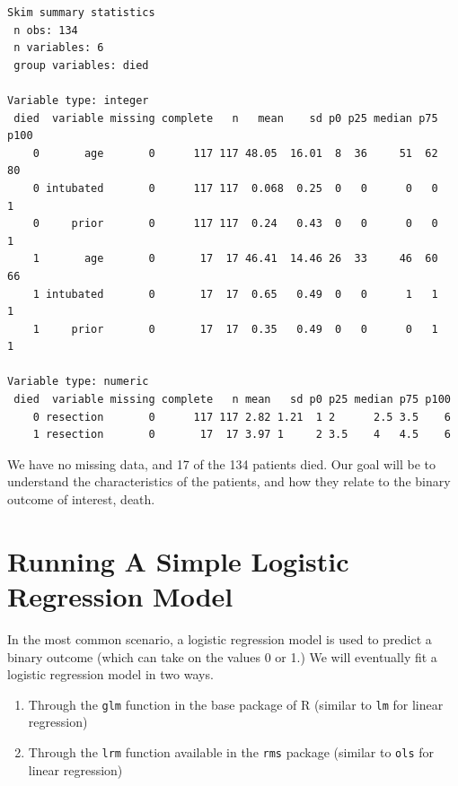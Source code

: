 \documentclass[]{book}
\newenvironment{Shaded}{\begin{snugshade}}{\end{snugshade}}
\newcommand{\KeywordTok}[1]{\textcolor[rgb]{0.13,0.29,0.53}{\textbf{#1}}}
\newcommand{\StringTok}[1]{\textcolor[rgb]{0.31,0.60,0.02}{#1}}
\newcommand{\OperatorTok}[1]{\textcolor[rgb]{0.81,0.36,0.00}{\textbf{#1}}}
\newcommand{\NormalTok}[1]{#1}
\providecommand{\tightlist}{%
  \setlength{\itemsep}{0pt}\setlength{\parskip}{0pt}}
\theoremstyle{definition}
\theoremstyle{definition}
\theoremstyle{definition}
\theoremstyle{remark}
\begin{document}
\begin{Shaded}
\end{Shaded}

\begin{verbatim}
Skim summary statistics
 n obs: 134 
 n variables: 6 
 group variables: died 

Variable type: integer 
 died  variable missing complete   n   mean    sd p0 p25 median p75 p100
    0       age       0      117 117 48.05  16.01  8  36     51  62   80
    0 intubated       0      117 117  0.068  0.25  0   0      0   0    1
    0     prior       0      117 117  0.24   0.43  0   0      0   0    1
    1       age       0       17  17 46.41  14.46 26  33     46  60   66
    1 intubated       0       17  17  0.65   0.49  0   0      1   1    1
    1     prior       0       17  17  0.35   0.49  0   0      0   1    1

Variable type: numeric 
 died  variable missing complete   n mean   sd p0 p25 median p75 p100
    0 resection       0      117 117 2.82 1.21  1 2      2.5 3.5    6
    1 resection       0       17  17 3.97 1     2 3.5    4   4.5    6
\end{verbatim}

We have no missing data, and 17 of the 134 patients died. Our goal will
be to understand the characteristics of the patients, and how they
relate to the binary outcome of interest, death.

\section{Running A Simple Logistic Regression
Model}\label{running-a-simple-logistic-regression-model}

In the most common scenario, a logistic regression model is used to
predict a binary outcome (which can take on the values 0 or 1.) We will
eventually fit a logistic regression model in two ways.

\begin{enumerate}
\def\labelenumi{\arabic{enumi}.}
\tightlist
\item
  Through the \texttt{glm} function in the base package of R (similar to
  \texttt{lm} for linear regression)
\item
  Through the \texttt{lrm} function available in the \texttt{rms}
  package (similar to \texttt{ols} for linear regression)
\end{enumerate}
\end{document}
